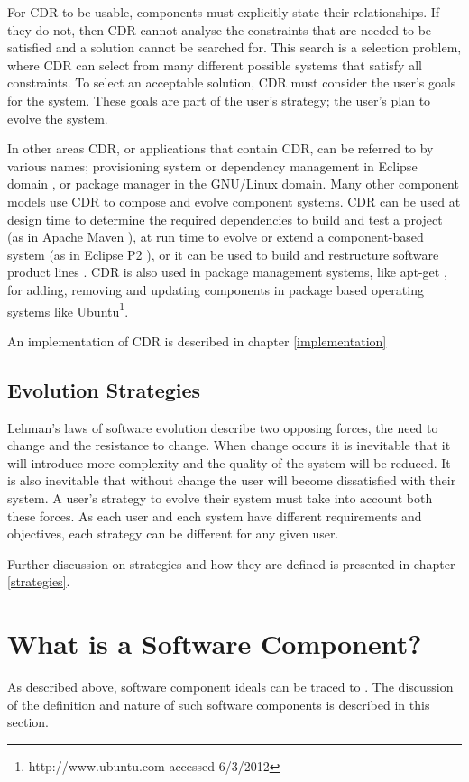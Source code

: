 For CDR to be usable, components must explicitly state their relationships.
If they do not, then CDR cannot analyse the constraints that are needed to be satisfied and a solution cannot be searched for.
This search is a selection problem, where CDR can select from many different possible systems that satisfy all constraints.
To select an acceptable solution, CDR must consider the user's goals for the system.
These goals are part of the user's strategy; the user's plan to evolve the system.

In other areas CDR, or applications that contain CDR, can be referred to by various names; provisioning system or dependency management in Eclipse domain \citep{leBerre2010},
or package manager in the GNU/Linux \citep{Barth2005} domain.
Many other component models use CDR to compose and evolve component systems.
CDR can be used at design time to determine the required dependencies to build and test a project (as in Apache Maven \citep{casey_better_2008}),
at run time to evolve or extend a component-based system (as in Eclipse P2 \citep{leBerre2010}),
or it can be used to build and restructure software product lines \citep{savolainen_analyzing_2007}.
CDR is also used in package management systems, like apt-get \citep{Barth2005},
for adding, removing and updating components in package based operating systems like Ubuntu\footnote{http://www.ubuntu.com accessed 6/3/2012}. 

An implementation of CDR is described in chapter \ref{implementation}

\subsection{Evolution Strategies}
Lehman's laws of software evolution \citep{lehman1980,lehman1997} describe two opposing forces,
the need to change and the resistance to change.
When change occurs it is inevitable that it will introduce more complexity and the quality of the system will be reduced.
It is also inevitable that without change the user will become dissatisfied with their system.
A user's strategy to evolve their system must take into account both these forces.
As each user and each system have different requirements and objectives, each strategy can be different for any given user.

Further discussion on strategies and how they are defined is presented in chapter \ref{strategies}.

\section{What is a Software Component?}
\label{background.components}
As described above, software component ideals can be traced to \citep{McIlroy1969}.
The discussion of the definition and nature of such software components is described in this section.

